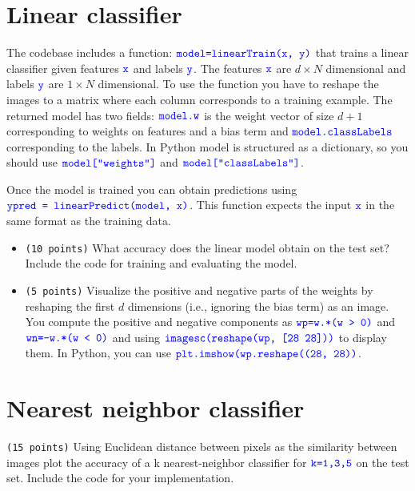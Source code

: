 \documentclass[10pt,letterpaper]{article}
\newcommand{\cmd}[1] {{\color{blue}\texttt{#1}}}
\begin{document}
\section{Linear classifier}
The codebase includes a function: $\cmd{model=linearTrain(x, y)}$ that trains a linear classifier given features $\cmd{x}$ and labels $\cmd{y}$. The features $\cmd{x}$ are $d \times N$ dimensional and labels $\cmd{y}$ are $1 \times N$ dimensional. To use the function you have to reshape the images to a matrix where each column corresponds to a training example. The returned model has two fields: $\cmd{model.w}$ is the weight vector of size $d+1$ corresponding to weights on features and a bias term and $\cmd{model.classLabels}$ corresponding to the labels. In Python model is structured as a dictionary, so you should use $\cmd{model["weights"]}$ and $\cmd{model["classLabels"]}$.

Once the model is trained you can obtain predictions using $\cmd{ypred = linearPredict(model, x)}$. This function expects the input $\cmd{x}$ in the same format as the training data.

\begin{itemize}
\item \cmd{(10 points)} What accuracy does the linear model obtain on the test set? Include the code for training and evaluating the model.
\item \cmd{(5 points)} Visualize the positive and negative parts of the weights by reshaping the first $d$ dimensions (i.e., ignoring the bias term) as an image. You compute the positive and negative components as $\cmd{wp=w.*(w > 0)}$ and $\cmd{wn=-w.*(w < 0)}$ and using $\cmd{imagesc(reshape(wp, [28 28]))}$ to display them. In Python, you can use $\cmd{plt.imshow(wp.reshape((28, 28))}$.
\end{itemize}

\section{Nearest neighbor classifier}
\cmd{(15 points)} Using Euclidean distance between pixels as the similarity between images plot the accuracy of a k nearest-neighbor classifier for $\cmd{k=1,3,5}$ on the test set. Include the code for your implementation.
\end{document}
